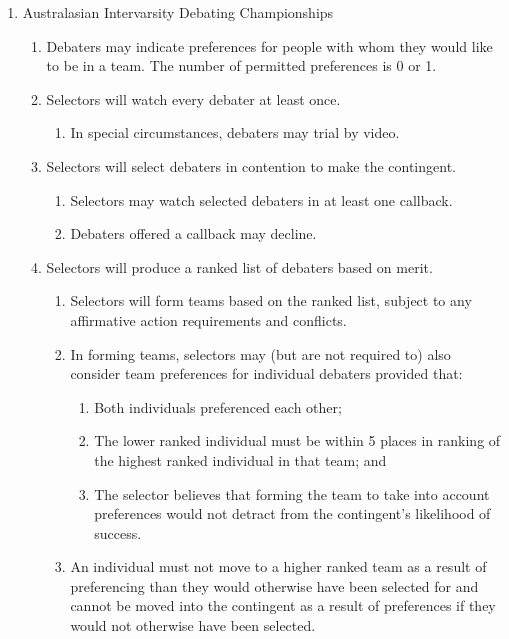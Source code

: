 \begin{enumerate}
\item Australasian Intervarsity Debating Championships
  \begin{enumerate}
  \item Debaters may indicate preferences for people with whom they would like to be in a team. The number of permitted preferences is 0 or 1.
  \item Selectors will watch every debater at least once.
    \begin{enumerate}
    \item In special circumstances, debaters may trial by video.
    \end{enumerate}
  \item Selectors will select debaters in contention to make the contingent.
    \begin{enumerate}
    \item Selectors may watch selected debaters in at least one callback.
    \item Debaters offered a callback may decline.
    \end{enumerate}
  \item Selectors will produce a ranked list of debaters based on merit.
    \begin{enumerate}
    \item Selectors will form teams based on the ranked list, subject to any affirmative action requirements and conflicts.
    \item In forming teams, selectors may (but are not required to) also consider team preferences for individual debaters provided that:
      \begin{enumerate}
      \item Both individuals preferenced each other;
      \item The lower ranked individual must be within 5 places in ranking of the highest ranked individual in that team; and
      \item The selector believes that forming the team to take into account preferences would not detract from the contingent’s likelihood of success.
      \end{enumerate}
    \item An individual must not move to a higher ranked team as a result of preferencing than they would otherwise have been selected for and cannot be moved into the contingent as a result of preferences if they would not otherwise have been selected.
    \end{enumerate}
  \end{enumerate}


\end{enumerate}
